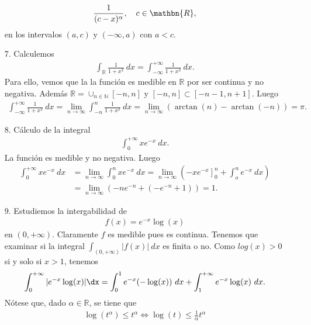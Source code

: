 \begin{ejemplo}
\begin{enumerate}
    \begin{align*}
        \frac{1}{(c-x)^{\alpha}}, \ \ \ c \in \mathbn{R},
    \end{align*}
    en los intervalos $(a,c)$ y $(-\infty,a)$ con $a < c$.
    \item[7.] Calculemos
    \begin{align*}
        \int_{\mathbb{R}}{\frac{1}{1 + x^2} \ dx} = \int_{-\infty}^{+\infty}{\frac{1}{1 + x^2} \ dx}.
    \end{align*}
    Para ello, vemos que la la función es medible en $\mathbb{R}$ por ser continua y no negativa. Además $\mathbb{R} = \cup_{n \in \mathbb{N}}{[-n,n]}$ y $[-n,n] \subset [-n-1,n+1]$. Luego
    \begin{align*}
        \int_{-\infty}^{+\infty}{\frac{1}{1 + x^2} \ dx} = \lim_{n \to \infty}{\int_{-n}^{n}{\frac{1}{1 + x^2} \ dx}} = \lim_{n \to \infty}{(\arctan(n) - \arctan(-n))} = \pi.
    \end{align*}
    \item[8.] Cálculo de la integral
    \begin{align*}
        \int_{0}^{+\infty}{xe^{-x} \ dx}.
    \end{align*}
    La función es medible y no negativa. Luego
    \begin{align*}
        \int_{0}^{+\infty}{xe^{-x} \ dx} &= \lim_{n \to \infty}{\int_{0}^{n}{xe^{-x} \ dx}} = \lim_{n \to \infty} {\left( \left. -xe^{-x}\right]_0^n + \int_{o}^{n}{e^{-x} \ dx} \right)}\\
        &= \lim_{n \to \infty}{(-ne^{-n} + (-e^{-n}+1))} = 1.
    \end{align*}
    \item[9.] Estudiemos la intergabilidad de
    \begin{align*}
        f(x) = e^{-x}\log(x)
    \end{align*}
    en $(0,+\infty)$. Claramente $f$ es medible pues es continua. Tenemos que examinar si la integral $\int_{(0,+\infty)}{|f(x)| \ dx}$ es finita o no. Como $log(x) > 0$ si y solo si $x > 1$, tenemos
    \begin{align*}
        \int_{0}^{+\infty}{|e^{-x}\log(x)| \dx} = \int_{0}^{1}{e^{-x}(-\log(x)) \ dx} + \int_{1}^{+\infty}{e^{-x}\log(x) \ dx}.
    \end{align*}
    Nótese que, dado $\alpha \in \mathbb{R}$, se tiene que
    \begin{align*}
        \log(t^{\alpha}) \leq t^{\alpha} \Longleftrightarrow \log(t) \leq \frac{1}{\alpha}t^{\alpha}
    \end{align*}

\end{enumerate}
\end{ejemplo}
